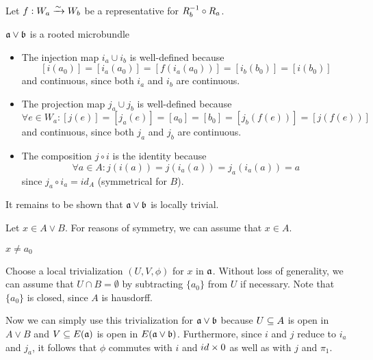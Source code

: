 \begin{myproof}
    Let $f: W_a \xrightarrow{\sim} W_b$ be a representative for $R_b^{-1} \circ R_a$.

    \begin{sectionize}
        \item $\ba \vee \bb$ is a rooted microbundle
        \begin{itemize}
            \item The injection map $i_a \cup i_b$ is well-defined because 
            \[ [i(a_0)] = [i_a(a_0)] = [f(i_a(a_0))] = [i_b(b_0)] = [i(b_0)] \]
            and continuous, since both $i_a$ and $i_b$ are continuous.
            \item The projection map $j_a \cup j_b$ is well-defined because
            \[ \forall e \in W_a: [j(e)] = [j_a(e)] = [a_0] = [b_0] = [j_b(f(e))] = [j(f(e))] \]
            and continuous, since both $j_a$ and $j_b$ are continuous.
            \item The composition $j \circ i$ is the identity because
            \[ \forall a \in A: j(i(a)) = j(i_a(a)) = j_a(i_a(a)) = a \]
            since $j_a \circ i_a = id_A$ (symmetrical for $B$).
        \end{itemize}
        It remains to be shown that $\ba \vee \bb$ is locally trivial.

        Let $x \in A \vee B$.
        For reasons of symmetry, we can assume that $x \in A$.
        \begin{caselist}
            \item $x \neq a_0$
            
            Choose a local trivialization $(U, V, \phi)$ for $x$ in $\mathfrak{a}$.
            Without loss of generality,
            we can assume that $U \cap B = \emptyset$ by subtracting
            $\{a_0\}$ from $U$ if necessary.
            Note that $\{a_0\}$ is closed, since $A$ is hausdorff.
            
            Now we can simply use this trivialization for $\ba \vee \bb$ because
            $U \subseteq{} A$ is open in $A \vee B$ and
            $V \subseteq{} E(\mathfrak{a})$ is open in $E(\ba \vee \bb)$.
            Furthermore, since $i$ and $j$ reduce to $i_a$ and $j_a$,
            it follows that $\phi$ commutes with $i$ and $id \times 0$
            as well as with $j$ and $\pi_1$.


\end{caselist}
\end{sectionize}
\end{myproof}
